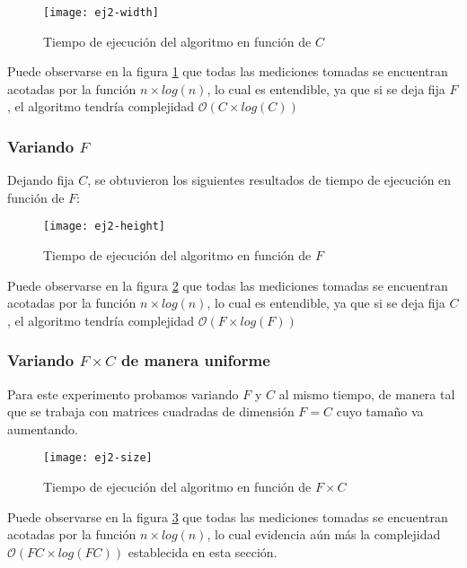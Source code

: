 \begin{figure}[H]
	\centering
	\texttt{[image: ej2-width]}
	\caption{Tiempo de ejecución del algoritmo en función de $C$}
	\label{fig:ej2-width-fig}
\end{figure}

Puede observarse en la figura \ref{fig:ej2-width-fig} que todas las mediciones tomadas se encuentran acotadas por la función $n \times log(n)$, lo cual es entendible, ya que si se deja fija $F$, el algoritmo tendría complejidad $\mathcal{O}(C \times log(C))$

\subsubsection{Variando $F$}

Dejando fija $C$, se obtuvieron los siguientes resultados de tiempo de ejecución en función de $F$:

\begin{figure}[H]
	\centering
	\texttt{[image: ej2-height]}
	\caption{Tiempo de ejecución del algoritmo en función de $F$}
	\label{fig:ej2-height-fig}
\end{figure}

Puede observarse en la figura \ref{fig:ej2-height-fig} que todas las mediciones tomadas se encuentran acotadas por la función $n \times log(n)$, lo cual es entendible, ya que si se deja fija $C$, el algoritmo tendría complejidad $\mathcal{O}(F \times log(F))$

\subsubsection{Variando $F \times C$ de manera uniforme}

Para este experimento probamos variando $F$ y $C$ al mismo tiempo, de manera tal que se trabaja con matrices cuadradas de dimensión $F = C$ cuyo tamaño va aumentando.

\begin{figure}[H]
	\centering
	\texttt{[image: ej2-size]}
	\caption{Tiempo de ejecución del algoritmo en función de $F \times C$}
	\label{fig:ej2-size-fig}
\end{figure}

Puede observarse en la figura \ref{fig:ej2-size-fig} que todas las mediciones tomadas se encuentran acotadas por la función $n \times log(n)$, lo cual evidencia aún más la complejidad $\mathcal{O}(FC \times log(FC))$ establecida en esta sección.
